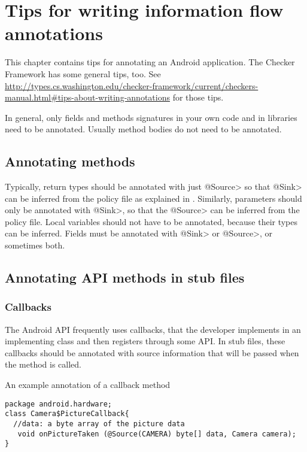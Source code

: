 \htmlhr
\chapter{Tips for writing information flow annotations\label{app-annotation}}

This chapter contains tips for annotating an Android application.  The Checker
Framework has some general tips, too.  See \url{http://types.cs.washington.edu/checker-framework/current/checkers-manual.html#tips-about-writing-annotations} for those tips.

In general, only fields and methods signatures in your own code and in
libraries need to be annotated. Usually method bodies do not need to be
annotated.


\section{Annotating  methods\label{sec:annomethods}}

Typically, return types should be annotated with just \<@Source> so that \<@Sink> can be
 inferred from the policy file as explained in . Similarly, parameters should
  only be annotated with  \<@Sink>, so that the \<@Source> can be inferred from  the policy file.
    Local variables should not have to be annotated, because their types can be inferred. Fields 
    must be annotated with   \<@Sink> or \<@Source>, or sometimes both. 

\section{Annotating API methods in stub files\label{sec:annoAPI}}

\subsection{Callbacks}
The Android API frequently uses callbacks, that the developer  
implements in an implementing class  and then registers through some API.
 In stub files, these callbacks should be annotated
with source information that will be passed when the method is called.  

An example annotation of a callback method
\begin{Verbatim}
package android.hardware;
class Camera$PictureCallback{
  //data: a byte array of the picture data
   void onPictureTaken (@Source(CAMERA) byte[] data, Camera camera);
}
\end{Verbatim}

